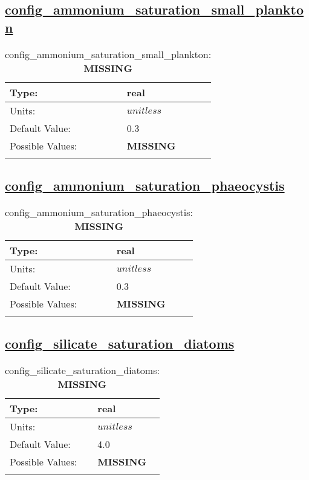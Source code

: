 \subsection[config\_ammonium\_saturation\_small\_plankton]{\hyperref[sec:nm_tab_biogeochemistry]{config\_ammonium\_saturation\_small\_plankton}}
\label{subsec:nm_sec_config_ammonium_saturation_small_plankton}
\begin{center}
\begin{longtable}{| p{2.0in} || p{4.0in} |}
    \hline
    Type: & real \\
    \hline
    Units: & $unitless$ \\
    \hline
    Default Value: & 0.3 \\
    \hline
    Possible Values: & {\bf \color{red} MISSING} \\
    \hline
    \caption{config\_ammonium\_saturation\_small\_plankton: {\bf \color{red} MISSING}}
\end{longtable}
\end{center}
\subsection[config\_ammonium\_saturation\_phaeocystis]{\hyperref[sec:nm_tab_biogeochemistry]{config\_ammonium\_saturation\_phaeocystis}}
\label{subsec:nm_sec_config_ammonium_saturation_phaeocystis}
\begin{center}
\begin{longtable}{| p{2.0in} || p{4.0in} |}
    \hline
    Type: & real \\
    \hline
    Units: & $unitless$ \\
    \hline
    Default Value: & 0.3 \\
    \hline
    Possible Values: & {\bf \color{red} MISSING} \\
    \hline
    \caption{config\_ammonium\_saturation\_phaeocystis: {\bf \color{red} MISSING}}
\end{longtable}
\end{center}
\subsection[config\_silicate\_saturation\_diatoms]{\hyperref[sec:nm_tab_biogeochemistry]{config\_silicate\_saturation\_diatoms}}
\label{subsec:nm_sec_config_silicate_saturation_diatoms}
\begin{center}
\begin{longtable}{| p{2.0in} || p{4.0in} |}
    \hline
    Type: & real \\
    \hline
    Units: & $unitless$ \\
    \hline
    Default Value: & 4.0 \\
    \hline
    Possible Values: & {\bf \color{red} MISSING} \\
    \hline
    \caption{config\_silicate\_saturation\_diatoms: {\bf \color{red} MISSING}}
\end{longtable}
\end{center}
